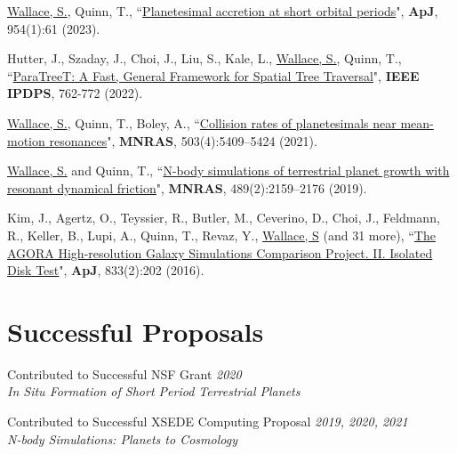 \documentclass[letterpaper,11pt]{article}
\newcommand{\PaperEntry}[6]{\noindent #1, ``{#2}", \textit{#3} \textbf{#4}, #5 (#6).}
\newcommand{\ProposalEntry}[3]{#1 \hfill {\em #2} \\ \textit{#3}}
\newcommand{\resumeSubHeadingListStart}{\begin{itemize}[leftmargin=0.15in, label={}]}
\newcommand{\resumeSubHeadingListEnd}{\end{itemize}}
\begin{document}
  \vspace{2pt}
  \resumeSubHeadingListStart
    \small{\item{

\PaperEntry{\underline{Wallace, S.}, Quinn, T.}{\href{https://doi.org/10.3847/1538-4357/ace89c}{Planetesimal accretion at short orbital periods}}{}{ApJ} {954(1):61}{2023} \\ \vspace{6pt}

\PaperEntry{Hutter, J., Szaday, J., Choi, J., Liu, S., Kale, L., \underline{Wallace, S.}, Quinn, T.}{\href{https://doi.org/10.1109/IPDPS53621.2022.00079}{ParaTreeT: A Fast, General Framework for Spatial Tree Traversal}}{}{IEEE IPDPS} {762-772}{2022} \\ \vspace{6pt}

\PaperEntry{\underline{Wallace, S.}, Quinn, T., Boley, A.}{\href{https://doi.org/10.1093/mnras/stab792}{Collision rates of planetesimals near mean-motion resonances}}{}{MNRAS} {503(4):5409–5424}{2021} \\ \vspace{6pt}

\PaperEntry{\underline{Wallace, S.} and Quinn, T.}{\href{https://doi.org/10.1093/mnras/stz2284}{N-body simulations of terrestrial planet growth with resonant dynamical friction}}{}{MNRAS}{489(2):2159–2176}{2019}  \\ \vspace{6pt}

\PaperEntry{Kim, J., Agertz, O., Teyssier, R., Butler, M., Ceverino, D., Choi, J., Feldmann, R., Keller, B., Lupi, A., Quinn, T., Revaz, Y., \underline{Wallace, S} (and 31 more)}{\href{https://doi.org/10.3847/1538-4357/833/2/202}{The AGORA High-resolution Galaxy Simulations Comparison Project. II. Isolated Disk Test}}{}{ApJ}{833(2):202}{2016} \\ \vspace{6pt}
        
    }}
  \resumeSubHeadingListEnd
  
    
\section{Successful Proposals}
  \resumeSubHeadingListStart
    \small{\item{
 
\ProposalEntry{Contributed to Successful NSF Grant}{2020}{In Situ Formation of Short Period Terrestrial Planets} \\ \vspace{6pt}

\ProposalEntry{Contributed to Successful XSEDE Computing Proposal}{2019, 2020, 2021}{N-body Simulations: Planets to Cosmology} \vspace{6pt}

 }}     
  \resumeSubHeadingListEnd
  
\end{document}
